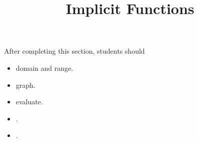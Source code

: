 \documentclass{ximera}
\title{Implicit Functions}
\begin{document}
\begin{abstract}
\end{abstract}
\maketitle

\begin{sectionOutcomes}
After completing this section, students should 

\begin{itemize}
\item domain and range.
\item graph.
\item evaluate.
\item .
\item .
\end{itemize}
\end{sectionOutcomes}
\end{document}
